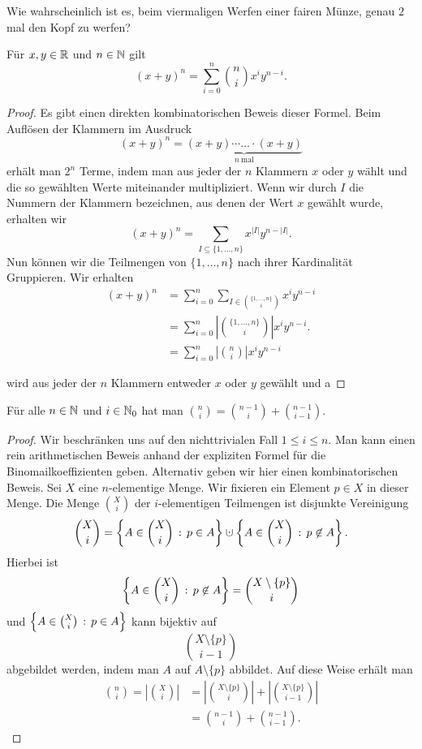 \begin{aufg}
	Wie wahrscheinlich ist es, beim viermaligen Werfen einer fairen Münze, genau $2$ mal den Kopf zu werfen?
\end{aufg} 

\begin{thm} 
	Für $x, y \in \mathbb{R}$ und $n \in \mathbb{N}$ gilt 
	\[
			(x+y)^n = \sum_{i=0}^n \binom{n}{i} x^i y^{n-i}. 
	\]
\end{thm} 
\begin{proof}
	Es gibt einen direkten kombinatorischen Beweis dieser Formel. Beim Auflösen der Klammern im Ausdruck 
	\[
			(x+y)^n = \underbrace{(x+y) \cdots \ldots \cdot (x+y)}_{n \ \text{mal}}
	\]
	erhält man $2^n$ Terme, indem man aus jeder der $n$ Klammern $x$ oder $y$ wählt und die so gewählten Werte miteinander multipliziert. Wenn wir durch $I$ die Nummern der Klammern bezeichnen, aus denen der Wert $x$ gewählt wurde, erhalten wir 
	\[
			(x+y)^n = \sum_{I \subseteq \{1,\ldots,n\}} x^{|I|} y^{n - |I|}. 
	\]
	Nun können wir die Teilmengen von $\{1,\ldots,n\}$ nach ihrer Kardinalität Gruppieren. Wir erhalten 
	\begin{align*}
			(x+y)^n & =\sum_{i=0}^n \sum_{I \in \binom{\{1,\ldots,n\}}{i}} x^i y^{n-i} 
			\\ & = \sum_{i=0}^n \left| \binom{\{1,\ldots,n\}}{i} \right| x^i y^{n-i}. 
			\\ & = \sum_{i=0}^n \left| \binom{n}{i} \right| x^i y^{n-i}
	\end{align*} 
	
	wird aus jeder der $n$ Klammern entweder $x$ oder $y$ gewählt und a
\end{proof} 

\begin{thm} \label{pascals:triangle} 
	Für alle $n \in \mathbb{N}$ und $i \in \mathbb{N}_0$ hat man $\binom{n}{i}  = \binom{n-1}{i}  + \binom{n-1}{i-1}$. 
\end{thm} 
\begin{proof} 
	Wir beschränken uns auf den nichttrivialen Fall $1 \le i \le n$. 
	Man kann einen rein arithmetischen Beweis anhand der expliziten Formel für die Binomailkoeffizienten geben. Alternativ geben wir hier einen kombinatorischen Beweis. Sei $X$ eine $n$-elementige Menge. Wir fixieren ein Element $p\in X$ in dieser Menge. Die Menge $\binom{X}{i}$ der $i$-elementigen Teilmengen ist disjunkte Vereinigung 
	\[
		\binom{X}{i} = \setcond{ A \in \binom{X}{i}}{p \in A} \cupdot \setcond{A \in \binom{X}{i}}{p \not\in A}. 
	\]
	Hierbei ist 
	\[
			\left\{ A \in \binom{X}{i} \,:\, p \not\in A \right\} = \binom{X \setminus \{p\}}{i}
	\]
	und $\left\{  A \in \binom{X}{i} \,:\, p \in A \right\}$ kann bijektiv auf 
	\[
			\binom{X \setminus \{p\}}{i-1}
	\]
	abgebildet werden, indem man $A$ auf $A \setminus \{p\}$ abbildet. Auf diese Weise erhält man 
	\begin{align*}
		\binom{n}{i} = \left| \binom{X}{i} \right| & = \left| \binom{X \setminus \{p\}}{i} \right| + \left| \binom{X \setminus \{p\}}{i-1}\right| 
		\\ & = \binom{n-1}{i} + \binom{n-1}{i-1}. 
	\end{align*} 
\end{proof} 

